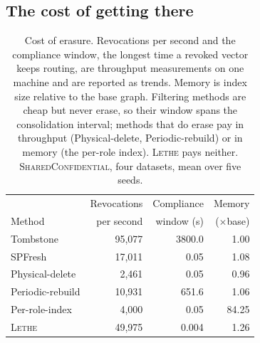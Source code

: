 \documentclass[sigconf, nonacm, review]{acmart}
\begin{document}
\subsection{The cost of getting there}
\label{sec:eval-cost}

\begin{table}[t]
\centering
\small
\caption{Cost of erasure. Revocations per second and the compliance window,
the longest time a revoked vector keeps routing, are throughput measurements
on one machine and are reported as trends. Memory is index size relative to
the base graph. Filtering methods are cheap but never erase, so their window
spans the consolidation interval; methods that do erase pay in throughput
(Physical-delete, Periodic-rebuild) or in memory (the per-role index).
\textsc{Lethe} pays neither. \textsc{SharedConfidential}, four
datasets, mean over five seeds.}
\label{tab:cost}
\setlength{\tabcolsep}{4pt}
\begin{tabular}{lrrr}
\toprule
       & Revocations & Compliance & Memory \\
Method & per second  & window (s) & ($\times$base) \\
\midrule
Tombstone        &  95{,}077 & 3800.0 &   1.00 \\
SPFresh          &  17{,}011 &   0.05 &   1.08 \\
Physical-delete  &   2{,}461 &    0.05 &  0.96 \\
Periodic-rebuild &  10{,}931 &  651.6 &   1.06 \\
Per-role-index   &   4{,}000 &    0.05 &  84.25 \\
\rowcolor{letherow}\textsc{Lethe}   &  49{,}975 &  0.004 &   1.26 \\
\bottomrule
\end{tabular}
\end{table}
\end{document}
